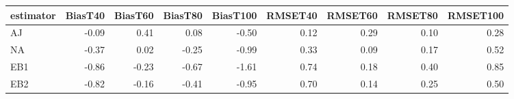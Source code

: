 \begin{table}[ht]
\centering
\begin{tabular}{lrrrrrrrr}
  \toprule
estimator & BiasT40 & BiasT60 & BiasT80 & BiasT100 & RMSET40 & RMSET60 & RMSET80 & RMSET100 \\ 
  \midrule
AJ & -0.09 & 0.41 & 0.08 & -0.50 & 0.12 & 0.29 & 0.10 & 0.28 \\ 
  NA & -0.37 & 0.02 & -0.25 & -0.99 & 0.33 & 0.09 & 0.17 & 0.52 \\ 
  EB1 & -0.86 & -0.23 & -0.67 & -1.61 & 0.74 & 0.18 & 0.40 & 0.85 \\ 
  EB2 & -0.82 & -0.16 & -0.41 & -0.95 & 0.70 & 0.14 & 0.25 & 0.50 \\ 
   \bottomrule
\end{tabular}
\end{table}
